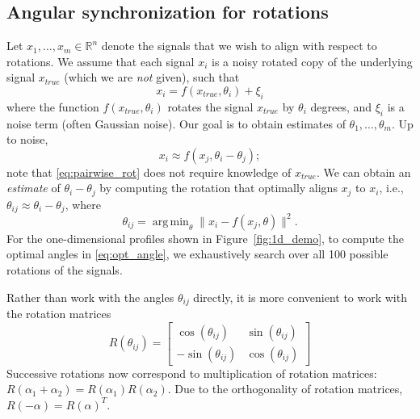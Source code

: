 \documentclass{pnastwo}
\DeclareMathOperator*{\argmin}{arg\,min}
\begin{document}
\begin{article}




\begin{materials}

\section{Angular synchronization for rotations\cite{singer2011angular}}

Let $x_1, \dots, x_m \in \mathbb{R}^n$ denote the signals that we wish to align with respect to rotations. 
%
We assume that each signal $x_i$ is a noisy rotated copy of the underlying signal $x_{true}$ (which we are {\em not} given), such that 
\begin{equation}
x_i = f(x_{true}, \theta_i) + \xi_i
\end{equation}
where the function $f(x_{true}, \theta_i)$ rotates the signal $x_{true}$ by $\theta_i$ degrees, and $\xi_i$ is a noise term (often Gaussian noise). 
%
Our goal is to obtain estimates of $\theta_1, \dots, \theta_m$.
%
Up to noise, 
\begin{equation} \label{eq:pairwise_rot}
x_i \approx f(x_j, \theta_i - \theta_j) ;
\end{equation}
 note that \eqref{eq:pairwise_rot} does not require knowledge of $x_{true}$.
%
We can obtain an {\em estimate} of $\theta_i - \theta_j$ by computing the rotation that optimally aligns $x_j$ to $x_i$, 
i.e., $\theta_{ij} \approx \theta_i - \theta_j$, where
%
\begin{equation} \label{eq:opt_angle}
\theta_{ij} = \argmin_{\theta} \|x_i - f(x_j, \theta)\|^2.
\end{equation}
%
For the one-dimensional profiles shown in Figure~\ref{fig:1d_demo}, to compute the optimal angles in \eqref{eq:opt_angle}, we exhaustively search over all 100 possible rotations of the signals. 

Rather than work with the angles $\theta_{ij}$ directly, it is more convenient to work with the rotation matrices 
\begin{equation} \label{eq:R_theta}
R(\theta_{ij}) = \begin{bmatrix}
\cos(\theta_{ij}) & \sin(\theta_{ij}) \\
-\sin(\theta_{ij}) & \cos(\theta_{ij})
\end{bmatrix}
\end{equation}
%
Successive rotations now correspond to multiplication of rotation matrices: $R(\alpha_1 + \alpha_2) = R(\alpha_1) R(\alpha_2)$.
%
Due to the orthogonality of rotation matrices, $R(-\alpha) = R(\alpha)^T$.


\end{materials}
\end{article}
\end{document}
